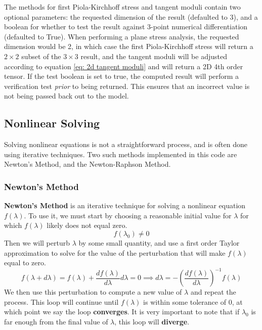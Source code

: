 \documentclass[]{spie}  %
\begin{document}
The methods for first Piola-Kirchhoff stress and tangent moduli contain two optional parameters: the requested dimension of the result (defaulted to 3), and a boolean for whether to test the result against 3-point numerical differentiation (defaulted to True). When performing a plane stress analysis, the requested dimension would be 2, in which case the first Piola-Kirchhoff stress will return a $2 \times 2$ subset of the $3 \times 3$ result, and the tangent moduli will be adjusted according to equation \ref{eq: 2d tangent moduli} and will return a 2D 4th order tensor. If the test boolean is set to true, the computed result will perform a verification test \textit{prior} to being returned. This ensures that an incorrect value is not being passed back out to the model. 


\subsection{Nonlinear Solving}
Solving nonlinear equations is not a straightforward process, and is often done using iterative techniques. Two such methods implemented in this code are Newton's Method, and the Newton-Raphson Method. 

\subsubsection{Newton's Method}
\label{sec: newton's method}
\textbf{Newton's Method} is an iterative technique for solving a nonlinear equation $f(\lambda)$. To use it, we must start by choosing a reasonable initial value for $\lambda$ for which $f(\lambda)$ likely does not equal zero. 
\begin{equation}
f(\lambda_0) \neq 0
\end{equation}
Then we will perturb $\lambda$ by some small quantity, and use a first order Taylor approximation to solve for the value of the perturbation that will make $f(\lambda)$ equal to zero.
\begin{equation}
\label{eq: dlambda}
f(\lambda + d\lambda) = f(\lambda) + \frac{df(\lambda)}{d\lambda}d\lambda = 0 \implies d\lambda = -\left(\frac{df(\lambda)}{d\lambda}\right)^{-1} f(\lambda)
\end{equation}
We then use this perturbation to compute a new value of $\lambda$ and repeat the process. This loop will continue until $f(\lambda)$ is within some tolerance of 0, at which point we say the loop \textbf{converges}. It is very important to note that if $\lambda_0$ is far enough from the final value of $\lambda$, this loop will \textbf{diverge}.
\end{document}
